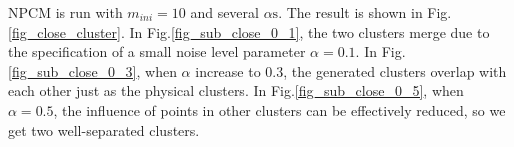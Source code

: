 \documentclass[journal]{IEEEtran}
\theoremstyle{definition}
\begin{document}
NPCM is run with $m_{ini}=10$ and several $\alpha\text{s}$. The result is shown in Fig.\ref{fig_close_cluster}. In Fig.\ref{fig_sub_close_0_1}, the two clusters merge due to the specification of a small noise level parameter $\alpha=0.1$. In Fig.\ref{fig_sub_close_0_3}, when $\alpha$ increase to $0.3$, the generated clusters overlap with each other just as the physical clusters. In Fig.\ref{fig_sub_close_0_5}, when $\alpha=0.5$, the influence of points in other clusters can be effectively reduced, so we get two well-separated clusters. 
\begin{figure}[tb]
\captionsetup[subfloat]{farskip=1pt,captionskip=1pt}%
   \centering
    \\

\end{figure}
\end{document}
